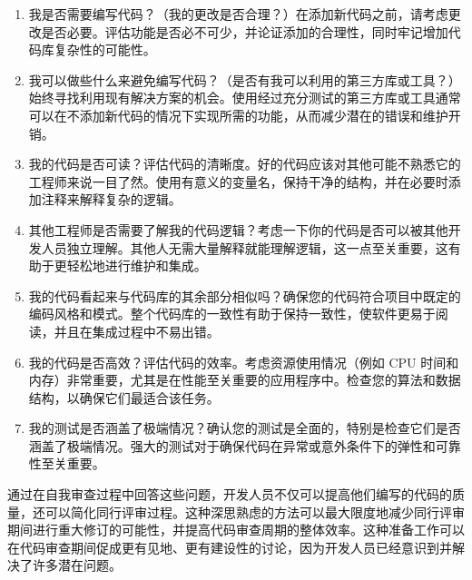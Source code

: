 \begin{enumerate}
\item
我是否需要编写代码？（我的更改是否合理？）在添加新代码之前，请考虑更改是否必要。评估功能是否必不可少，并论证添加的合理性，同时牢记增加代码库复杂性的可能性。

\item
我可以做些什么来避免编写代码？（是否有我可以利用的第三方库或工具？）始终寻找利用现有解决方案的机会。使用经过充分测试的第三方库或工具通常可以在不添加新代码的情况下实现所需的功能，从而减少潜在的错误和维护开销。

\item
我的代码是否可读？评估代码的清晰度。好的代码应该对其他可能不熟悉它的工程师来说一目了然。使用有意义的变量名，保持干净的结构，并在必要时添加注释来解释复杂的逻辑。

\item
其他工程师是否需要了解我的代码逻辑？考虑一下你的代码是否可以被其他开发人员独立理解。其他人无需大量解释就能理解逻辑，这一点至关重要，这有助于更轻松地进行维护和集成。

\item
我的代码看起来与代码库的其余部分相似吗？确保您的代码符合项目中既定的编码风格和模式。整个代码库的一致性有助于保持一致性，使软件更易于阅读，并且在集成过程中不易出错。

\item
我的代码是否高效？评估代码的效率。考虑资源使用情况（例如 CPU 时间和内存）非常重要，尤其是在性能至关重要的应用程序中。检查您的算法和数据结构，以确保它们最适合该任务。

\item
我的测试是否涵盖了极端情况？确认您的测试是全面的，特别是检查它们是否涵盖了极端情况。强大的测试对于确保代码在异常或意外条件下的弹性和可靠性至关重要。
\end{enumerate}

通过在自我审查过程中回答这些问题，开发人员不仅可以提高他们编写的代码的质量，还可以简化同行评审过程。这种深思熟虑的方法可以最大限度地减少同行评审期间进行重大修订的可能性，并提高代码审查周期的整体效率。这种准备工作可以在代码审查期间促成更有见地、更有建设性的讨论，因为开发人员已经意识到并解决了许多潜在问题。




















